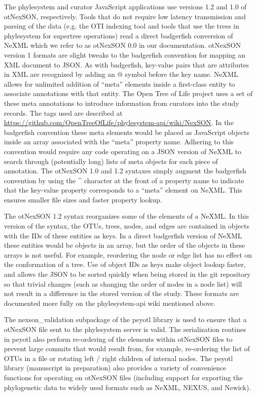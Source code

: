 \documentclass{bioinfo}
\newcommand{\ps}{phylesystem\xspace}
\newcommand{\otol}{Open Tree of Life\xspace}
\newcommand{\nexson}{otNexSON\xspace}
\newcommand{\js}{JavaScript\xspace}
\begin{document}
\begin{methods}
The \ps and curator \js applications use versions 1.2 and 1.0 of \nexson, respectively.
Tools that do not require low latency transmission and parsing of the data (e.g. the OTI indexing tool
    and tools that use the trees in \ps for supertree operations)
    read a direct badgerfish \citep{badgerfish} conversion of NeXML which we refer to as \nexson 0.0 in our documentation.
\nexson version 1 formats are slight tweaks to the badgerfish convention for mapping an XML document to JSON.
As with badgerfish, key-value pairs that are attributes in XML are recognized by adding an @ symbol before the key name.
NeXML allows for unlimited addition of ``meta'' elements inside a first-class entity to associate annotations with that entity.
The \otol project uses a set of these meta annotations to introduce information from curators into the study records.
The tags used are described at \url{https://github.com/OpenTreeOfLife/phylesystem-api/wiki/NexSON}.
In the badgerfish convention these meta elements would be placed as \js objects inside an array associated with the ``meta'' property name.
Adhering to this convention would require any code operating on a JSON version of NeXML to search through (potentially
    long) lists of meta objects for each piece of annotation.
The \nexson 1.0 and 1.2 syntaxes simply augment the badgerfish convention by using the \^{} character at the front of a
    property name to indicate that the key-value property corresponds to a ``meta'' element on NeXML.
This ensures smaller file sizes and faster property lookup.

The \nexson 1.2 syntax reorganizes some of the elements of a NeXML.
In this version of the syntax, the OTUs, trees, nodes, and edges are contained in objects with the IDs of these entities as keys.
In a direct badgerfish version of NeXML these entities would be objects in an array, but the order of the objects
    in these arrays is not useful.
For example, reordering the node or edge list has no effect on the conformation of a tree.
Use of object IDs as keys make object lookup faster, and allows the JSON to be sorted quickly when being stored in 
    the git repository so that trivial changes (such as changing the order of nodes in a node list) will not result in 
    a difference in the stored version of the study.
These formats are documented more fully on the \ps-api wiki mentioned above.

The nexson\_validation subpackage of the peyotl library is used to ensure that a \nexson file sent to the \ps
    server is valid.
The serialization routines in peyotl also perform re-ordering of the elements within \nexson files to
    prevent large commits that would result from, for example, re-ordering the list of OTUs in a file or
    rotating left / right children of internal nodes.
The peyotl library (manuscript in preparation) also 
    provides a variety of convenience functions for operating on \nexson files (including support
    for exporting the phylogenetic data to widely used formats such as NeXML, NEXUS, and Newick).


\end{methods}
\end{document}

